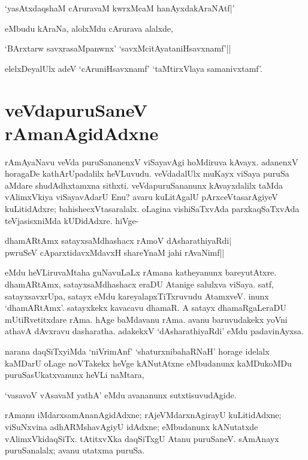 \begin{shloka}
`yasAtxdaqshaM cAruravaM kwrxMcaM hanAyxdakAraNAtf|'\label{250d}
\end{shloka}

eMbudu kAraNa, alolxMdu cArurava alalxde, 

\begin{shloka}
`BArxtarw savxrasaMpanwnx' `savxMcitAyataniHsavxnamf'||\label{250b}
\end{shloka}

elelxDeyalUlx adeV `cAruniHsavxnamf'\label{250} `taMtirxVlaya samanivxtamf'.

\section*{veVdapuruSaneV rAmanAgidAdxne}

rAmAyaNavu veVda puruSananenxV viSayavAgi hoMdiruva kAvayx. adanenxV horagaDe kathArUpadalilx heVLuvudu. veVdadalUlx muKayx viSaya puruSa aMdare shudAdhxtamxna sithxti. veVdapuruSananunx kAvayxdalilx taMda vAlimxVkiya viSayavAdarU Enu? avaru kuLitAgalU pArxceVtasarAgiyeV kuLitidAdxre; bahishecxVtasaralalx. oLagina vishiSaTxvAda parxkaqSaTxvAda teVjasisxniMda kUDidAdxre. hiVge-

\begin{shloka}
dhamARtAmx satayxsaMdhashacx rAmoV dAsharathiyaRdi|\label{250a}\\
pwruSeV cAparxtidavxMdavxH shareYnaM jahi rAvaNimf||
\end{shloka}

eMdu heVLiruvaMtaha guNavuLaLx rAmana katheyanunx bareyutAtxre. dhamARtAmx, satayxsaMdhashacx eraDU Atanige salulxva viSaya. satf, satayxsavxrUpa, satayx eMdu kareyalapxTiTxruvudu AtamxveV. inunx `dhamARtAmx'. satayxkekx kavacavu dhamaR.  A satayx dhamaRgaLeraDU mUtiRvetitxdare rAma. hAge baMdavanu rAma. avanu baruvudakekx yoVni athavA dAvxravu dasharatha. adakekxV `dAsharathiyaRdi' eMdu padavinAyxsa. 

narana daqSiTxyiMda `niVrimAnf' `shaturxnibahaRNaH'\label{250f} horage idelalx kaMDarU oLage noVTakekx heVge kANutAtxne eMbudanunx kaMDukoMDu puruSasUkatxvanunx heVLi naMtara, 

\begin{shloka}
`vasavoV vAsavaM yathA'\label{250e} eMdu avananunx sutxtisuvudAgide.
\end{shloka}

rAmanu iMdarxsamAnanAgidAdxne; rAjeVMdarxnAgirayU kuLitidAdxne; viSuNxvina adhARMshavAgiyU idAdxne; eMbudanunx kANutatxde vAlimxVkidaqSiTx. tAtitxvXka daqSiTxgU Atanu puruSaneV. sAmAnayx puruSanalalx; avanu utatxma puruSa. 

